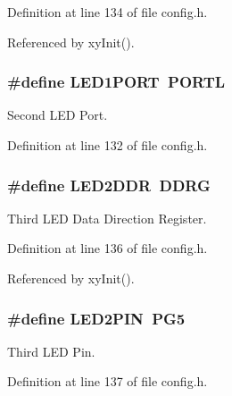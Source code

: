 Definition at line 134 of file config.\-h.



Referenced by xy\-Init().

\hypertarget{group__config_ga3931891a757b08dbdfeaa8afd4dcb664}{
\subsubsection[{L\-E\-D1\-P\-O\-R\-T}]{\setlength{\rightskip}{0pt plus 5cm}\#define L\-E\-D1\-P\-O\-R\-T~P\-O\-R\-T\-L}}\label{group__config_ga3931891a757b08dbdfeaa8afd4dcb664}


Second L\-E\-D Port. 



Definition at line 132 of file config.\-h.

\hypertarget{group__config_ga7e635626ee31b094da0a668476132577}{
\subsubsection[{L\-E\-D2\-D\-D\-R}]{\setlength{\rightskip}{0pt plus 5cm}\#define L\-E\-D2\-D\-D\-R~D\-D\-R\-G}}\label{group__config_ga7e635626ee31b094da0a668476132577}


Third L\-E\-D Data Direction Register. 



Definition at line 136 of file config.\-h.



Referenced by xy\-Init().

\hypertarget{group__config_ga50070e632cb68d11f627c5ab60f88683}{
\subsubsection[{L\-E\-D2\-P\-I\-N}]{\setlength{\rightskip}{0pt plus 5cm}\#define L\-E\-D2\-P\-I\-N~P\-G5}}\label{group__config_ga50070e632cb68d11f627c5ab60f88683}


Third L\-E\-D Pin. 



Definition at line 137 of file config.\-h.



